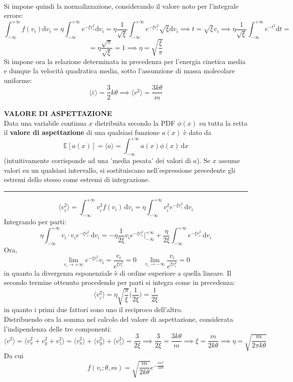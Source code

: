 \documentclass[10pt, oneside]{book}
\newcommand{\limit}[2]{\lim\limits_{#1 \rightarrow #2}}
\newcommand{\mean}[1]{\langle #1 \rangle}
\newcommand{\infobox}[2]{\vspace{0.5cm}~\\ \textbf{#1} \hrulefill \vspace{0.2cm}\\#2 \\\hrule \vspace{0.5cm}}
\begin{document}
\\Si impone quindi la normalizzazione, considerando il valore noto per l'integrale errore:
\[\int_{-\infty}^{+\infty}f(v_i)\mathrm{d}v_i = \eta \int_{-\infty}^{+\infty}e^{-\xi v_i^2}\mathrm{d}v_i = \eta \frac{1}{\sqrt{\xi}} \int_{-\infty}^{+\infty} e^{-\xi v_i^2}\sqrt{\xi}\mathrm{d}v_i \implies
t = \sqrt{\xi}v_i \implies \eta \frac{1}{\sqrt{\xi}} \int_{-\infty}^{+\infty}e^{-t^2}\mathrm{d}t =\]
\[= \eta \frac{\sqrt{\pi}}{\sqrt{\xi}} = 1 \implies \eta = \sqrt{\frac{\xi}{\pi}}\]
Si impone ora la relazione determinata in precedenza per l'energia cinetica media e dunque la velocità quadratica media, sotto l'assunzione di massa molecolare uniforme:
\[\langle \varepsilon \rangle = \frac{3}{2} k \theta \implies \langle v^2 \rangle = \frac{3 k \theta}{m}\]
\infobox{VALORE DI ASPETTAZIONE}{Data una variabile continua $x$ distribuita secondo la PDF $\phi(x)$ su tutta la retta il \textbf{valore di aspettazione} di una qualsiasi funzione $a(x)$ è dato da
\[\mathbb{E}[a(x)] = \langle a \rangle = \int_{-\infty}^{+\infty} a(x) \phi(x) \, \mathrm{d}x\]
(intuitivamente corrisponde ad una 'media pesata' dei valori di $a$). Se $x$ assume valori su un qualsiasi intervallo, si sostituiscano nell'espressione precedente gli estremi dello stesso come estremi di integrazione.}
\[\langle v_i^2 \rangle = \int_{-\infty}^{+\infty} v_i^2 f(v_i)\, \mathrm{d}v_i = \eta \int_{-\infty}^{+\infty} v_i^2 e^{-\xi v_i^2}\, \mathrm{d}v_i\]
Integrando per parti:
\[\eta \int_{-\infty}^{+\infty} v_i \cdot v_i e^{- \xi v_i^2}\, \mathrm{d}v_i = - \eta \frac{1}{2 \xi} v_i e^{- \xi v_i^2}\bigg|_{-\infty}^{+\infty} + \frac{\eta}{2\xi} \int_{-\infty}^{+\infty} e^{-\xi v_i^2}\, \mathrm{d}v_i\]
Ora,
\[\limit{v_i}{+\infty} e^{- \xi v_i^2} v_i = \frac{v_i}{e^{\xi v_i^2}} = 0 \quad \limit{v_i}{-\infty} \frac{v_i}{e^{\xi v_i^2}} = 0\]
in quanto la divergenza esponenziale è di ordine superiore a quella lineare. Il secondo termine ottenuto procedendo per parti si integra come in precedenza:
\[\mean{v_i^2} = \eta \sqrt{\frac{\pi}{\xi}} \big(\frac{1}{2 \xi}\big) = \frac{1}{2 \xi}\]
in quanto i primi due fattori sono uno il reciproco dell'altro.
\\Distribuendo ora la somma nel calcolo del valore di aspettazione, considerata l'indipendenza delle tre componenti:
\[\mean{v^2} = \mean{v_x^2 + v_y^2 + v_z^2} = \mean{v_x^2} + \mean{v_y^2} + \mean{v_z^2} = \frac{3}{2 \xi} \implies \frac{3}{2 \xi} = \frac{3k \theta}{m} \implies \xi = \frac{m}{2 k \theta} 	\implies \eta = \sqrt{\frac{m}{2 \pi k \theta}}\]
Da cui
\[f(v_i; \theta, m) = \sqrt{\frac{m}{2 k \theta}} e^{\displaystyle - \frac{m v_i^2}{2 k \theta}}\]
\end{document}
